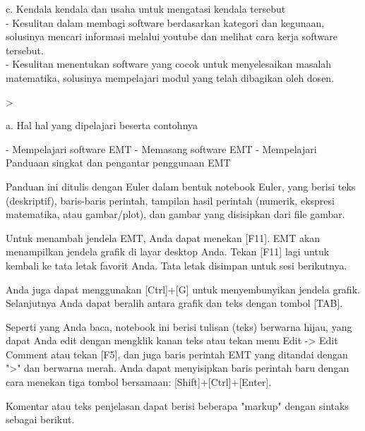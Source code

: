 \documentclass[a4paper,10pt]{article}
\begin{document}
\begin{eulernotebook}
\begin{eulercomment}
c. Kendala kendala dan usaha untuk mengatasi kendala tersebut\\
- Kesulitan dalam membagi software berdasarkan kategori dan kegunaan,
solusinya mencari informasi melalui youtube dan melihat cara kerja
software tersebut.\\
- Kesulitan menentukan software yang cocok untuk menyelesaikan masalah
matematika, solusinya mempelajari modul yang telah dibagikan oleh
dosen.\\
\end{eulercomment}
\eulersubheading{}
\begin{eulerprompt}
> 
\end{eulerprompt}
\begin{eulercomment}
a. Hal hal yang dipelajari beserta contohnya\\
\end{eulercomment}
\begin{eulerttcomment}
   - Mempelajari software EMT
   - Memasang software EMT
   - Mempelajari Panduaan singkat dan pengantar penggunaan EMT
\end{eulerttcomment}
\begin{eulercomment}
Panduan ini ditulis dengan Euler dalam bentuk notebook Euler, yang
berisi teks (deskriptif), baris-baris perintah, tampilan hasil
perintah (numerik, ekspresi matematika, atau gambar/plot), dan gambar
yang disisipkan dari file gambar.

Untuk menambah jendela EMT, Anda dapat menekan [F11]. EMT akan
menampilkan jendela grafik di layar desktop Anda. Tekan [F11] lagi
untuk kembali ke tata letak favorit Anda. Tata letak disimpan untuk
sesi berikutnya.

Anda juga dapat menggunakan [Ctrl]+[G] untuk menyembunyikan jendela
grafik. Selanjutnya Anda dapat beralih antara grafik dan teks dengan
tombol [TAB].

Seperti yang Anda baca, notebook ini berisi tulisan (teks) berwarna
hijau, yang dapat Anda edit dengan mengklik kanan teks atau tekan menu
Edit -\textgreater{} Edit Comment atau tekan [F5], dan juga baris perintah EMT yang
ditandai dengan "\textgreater{}" dan berwarna merah. Anda dapat menyisipkan baris
perintah baru dengan cara menekan tiga tombol bersamaan:
[Shift]+[Ctrl]+[Enter].

\end{eulercomment}
\begin{eulercomment}
Komentar atau teks penjelasan dapat berisi beberapa "markup" dengan
sintaks sebagai berikut.


\end{eulercomment}
\end{eulernotebook}
\end{document}
